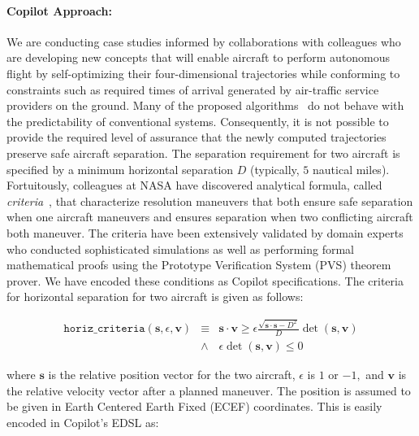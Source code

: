 \paragraph{Copilot Approach:} We are conducting case studies informed
by collaborations with colleagues who are developing new concepts that
will enable aircraft to perform autonomous flight by self-optimizing
their four-dimensional trajectories while conforming to constraints
such as required times of arrival generated by air-traffic service
providers on the ground. Many of the proposed
algorithms~\cite{KarrVRC} do not behave with the predictability of
conventional systems.  Consequently, it is not possible to provide the
required level of assurance that the newly computed trajectories
preserve safe aircraft separation.  The separation requirement for two aircraft is specified by a minimum
horizontal separation $D$ (typically, $5$ nautical miles).
Fortuitously, colleagues at NASA have discovered analytical formula,
called \emph{criteria}~\cite{NM2011NASA}, that characterize resolution
maneuvers that both ensure safe separation when one aircraft maneuvers
and ensures separation when two conflicting aircraft both
maneuver. The criteria have been extensively validated by domain
experts who conducted sophisticated simulations as well as performing
formal mathematical proofs using the Prototype Verification System
(PVS) theorem prover. We have encoded these conditions as Copilot
specifications. The criteria for horizontal separation for two
aircraft is given as follows:

\begin{eqnarray*} \texttt{horiz\_criteria}(\bm{s}, \epsilon, \bm{v})
& \equiv &  \bm{s} \cdot \bm{v} \geq \epsilon  \frac{\sqrt{\bm{s} \cdot
  \bm{s}  - D^2}} {D} \operatorname{det}(\bm{s},\bm{v})  \\
& \wedge &  \epsilon \operatorname{det}(\bm{s},\bm{v})  \leq  0 
\end{eqnarray*}

\noindent 
where $\bm{s}$ is the relative position 
vector for the two aircraft, $\epsilon$ is $1$ or $-1,$  and 
$\bm{v}$ is the relative velocity vector after a planned maneuver. 
The position is  assumed to be given in Earth Centered Earth Fixed (ECEF)
coordinates.  This is easily encoded in  Copilot's EDSL as:

